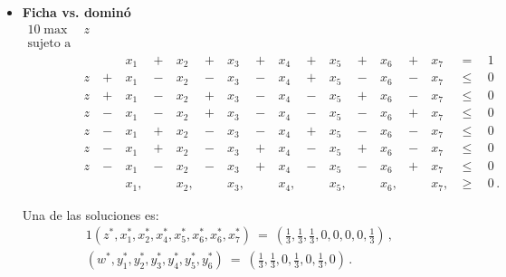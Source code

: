 \begin{itemize}
\item \textbf{Ficha vs. dominó}
\begin{alignat}{10}
\label{apex:eq:pl-domino}
\max\ &z\ & & & & & & & & & & & & & & & & \\ \nonumber
\text{sujeto a}\ & & & & & & & & & & & & & & & & \\ \nonumber 
	&   &   & x_1\ & +\ & x_2\ & +\ & x_3\ & +\ & x_4\ & +\ & x_5\ & +\ & x_6\ & +\ & x_7\ & \ =\    & \ 1 \\ \nonumber
    &z\ &+\ & x_1\ & -\ & x_2\ & -\ & x_3\ & -\ & x_4\ & +\ & x_5\ & -\ & x_6\ & -\ & x_7\ & \ \leq\ & \ 0 \\ \nonumber
    &z\ &+\ & x_1\ & -\ & x_2\ & +\ & x_3\ & -\ & x_4\ & -\ & x_5\ & +\ & x_6\ & -\ & x_7\ & \ \leq\ & \ 0 \\ \nonumber
    &z\ &-\ & x_1\ & -\ & x_2\ & +\ & x_3\ & -\ & x_4\ & -\ & x_5\ & -\ & x_6\ & +\ & x_7\ & \ \leq\ & \ 0 \\ \nonumber
    &z\ &-\ & x_1\ & +\ & x_2\ & -\ & x_3\ & -\ & x_4\ & +\ & x_5\ & -\ & x_6\ & -\ & x_7\ & \ \leq\ & \ 0 \\ \nonumber
    &z\ &-\ & x_1\ & +\ & x_2\ & -\ & x_3\ & +\ & x_4\ & -\ & x_5\ & +\ & x_6\ & -\ & x_7\ & \ \leq\ & \ 0 \\ \nonumber
    &z\ &-\ & x_1\ & -\ & x_2\ & -\ & x_3\ & +\ & x_4\ & -\ & x_5\ & -\ & x_6\ & +\ & x_7\ & \ \leq\ & \ 0 \\ \nonumber
    &   &   & x_1, &    & x_2, &    & x_3, &    & x_4, &    & x_5, &    &x_6,  &    & x_7, & \ \geq\ & \ 0 \,.
\end{alignat}

Una de las soluciones es:
\begin{alignat}{1}
(z^*, x^*_1, x^*_2, x^*_4, x^*_5, x^*_6, x^*_6, x^*_7)\ =\ \left(\frac{1}{3}, \frac{1}{3}, \frac{1}{3}, 0, 0, 0, 0, \frac{1}{3}\right) \,, \\
(w^*, y^*_1, y^*_2, y^*_3,  y^*_4, y^*_5, y^*_6)\ =\ \left(\frac{1}{3}, \frac{1}{3}, 0, \frac{1}{3}, 0, \frac{1}{3}, 0\right) \,.
\end{alignat}
\end{itemize}